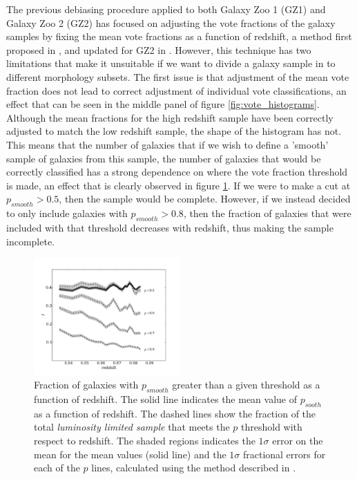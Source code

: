 \documentclass[useAMS,usenatbib]{mn2e}
\begin{document}
The previous debiasing procedure applied to both Galaxy Zoo 1 (GZ1) and Galaxy Zoo 2 (GZ2) has focused on adjusting the vote fractions of the galaxy samples by fixing the mean vote fractions as a function of redshift, a method first proposed in \cite{Bamford_09}, and updated for GZ2 in \citep{Willett_13}. However, this technique has two limitations that make it unsuitable if we want to divide a galaxy sample in to different morphology subsets. The first issue is that adjustment of the mean vote fraction does not lead to correct adjustment of individual vote classifications, an effect that can be seen in the middle panel of figure \ref{fig:vote_histograms}. Although the mean fractions for the high redshift sample have been correctly adjusted to match the low redshift sample, the shape of the histogram has not. This means that the number of galaxies that if we wish to define a 'smooth' sample of galaxies from this sample, the number of galaxies that would be correctly classified has a strong dependence on where the vote fraction threshold is made, an effect that is clearly observed in figure \ref{fig:p_bias}. If we were to make a cut at $p_{smooth} > 0.5$, then the sample would be complete. However, if we instead decided to only include galaxies with $p_{smooth} > 0.8$, then the fraction of galaxies that were included with that threshold decreases with redshift, thus making the sample incomplete.

\begin{figure}
		\centering

        \includegraphics[width=0.5\textwidth]{Data_imgs/p_bias.pdf}

        \caption{Fraction of galaxies with $p_{smooth}$ greater than a given threshold as a function of redshift. The solid line indicates the mean value of $p_{sooth}$ as a function of redshift. The dashed lines show the fraction of the total \textit{luminosity limited sample} that meets the $p$ threshold with respect to redshift. The shaded regions indicates the $1 \sigma$ error on the mean for the mean values (solid line) and the $1 \sigma$ fractional errors for each of the $p$ lines, calculated using the method described in \citet{Cameron_11}.}

        \label{fig:p_bias}

\end{figure}
\end{document}
